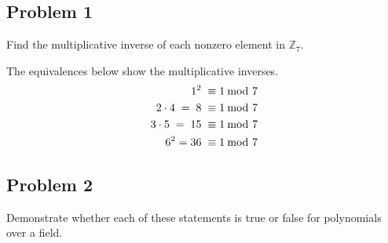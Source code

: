 \documentclass[../hw_sols.tex]{subfiles}
\begin{document}

\subsection*{Problem 1}

Find the multiplicative inverse of each nonzero element in $\mathbb{Z}_7$.

\begin{solution}
The equivalences below show the multiplicative inverses.
\begin{align*}
	1^2 \; \equiv& \; 1 \tmod{7} \\
	2 \cdot 4 \; = \; 8 \; \equiv& \; 1 \tmod{7} \\
	3 \cdot 5 \; = \; 15 \; \equiv& \; 1 \tmod{7} \\
	6^2 = 36 \; \equiv& \; 1 \tmod{7}
\end{align*}
\end{solution}



\subsection*{Problem 2}

Demonstrate whether each of these statements is true or false for polynomials 
over a field.
\end{document}
